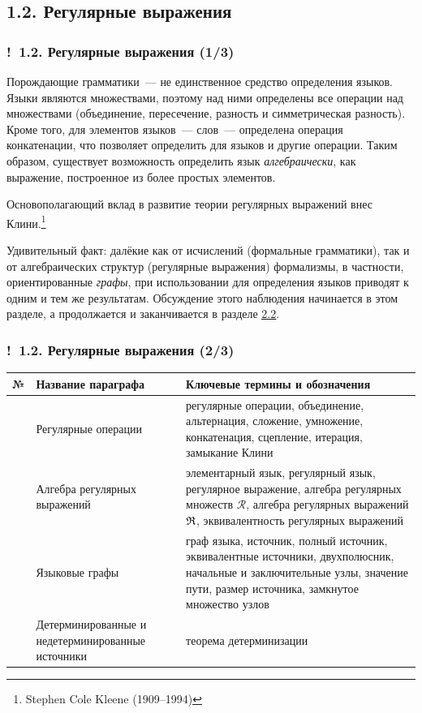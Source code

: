 \documentclass[mathserif,12pt,aspectratio=169]{beamer}
\def\emразделенной{\em разделенной}
\def\em#1{\it\color{blue}#1}
\let\cal\mathcal
\def\DMref#1#2{{\color{blue}\underline{\hyperlink{#2}{#1}}}}
\def\Ok{{\color{green}\textbf{!}\ }}
\begin{document}
\subsection{1.2. Регулярные выражения}
\begin{frame}
\frametitle{\Ok 1.2. Регулярные выражения (1/3)}

Порождающие грамматики~--- не единственное средство определения
языков. Языки являются множествами, поэтому над ними определены
все операции над множествами 
(объединение, пересечение, разность и 
симметрическая разность). Кроме того, для
элементов языков~--- слов~--- определена операция конкатенации,
что позволяет определить для языков и другие операции. 
Таким образом,
существует возможность определить язык
{\em алгебраически}, как выражение,
построенное из более простых элементов.

\medskip
Основополагающий вклад в развитие теории регулярных выражений 
внес Клини.\footnote{Stephen Cole Kleene (1909--1994)}

\medskip
Удивительный факт: далёкие как от исчислений (формальные грамматики),
так и от алгебраических структур (регулярные выражения) формализмы,
в частности, ориентированные {\em графы}, при использовании для определения 
языков приводят к одним и тем же результатам. Обсуждение этого наблюдения
начинается в этом разделе, а продолжается и заканчивается в разделе
\DMref{2.2}{2.2}.     

\end{frame}

\begin{frame}
\frametitle{\Ok 1.2. Регулярные выражения (2/3)}

\begin{tabular}[t]{p{10mm}|p{40mm}|p{95mm}}
  № & Название параграфа
  & Ключевые термины и обозначения \\
  \hline
\text{\DMref{1.2.1.}{1.2.1.}} &  Регулярные операции
  & { регулярные операции, 
  объединение, альтернация, сложение, умножение, конкатенация, сцепление,
  итерация, замыкание Клини}
   \\
\text{\DMref{1.2.2.}{1.2.2.}} & Алгебра регулярных выражений 
  & 
{ элементарный язык,
  регулярный язык, регулярное выражение, 
  алгебра регулярных множеств $\cal{R}$, алгебра регулярных выражений $\frak{R}$,
  эквивалентность регулярных выражений}
  \\
\text{\DMref{1.2.3.}{1.2.3.}}  & Языковые графы &
{граф языка, источник, полный источник, эквивалентные источники,
  двухполюсник, начальные и заключительные узлы, значение пути, размер источника,
  замкнутое множество узлов } 
  \\ 
\text{\DMref{1.2.4.}{1.2.4.}}  & Детерминированные и недетерминированные источники &
{ теорема детерминизации } 
\end{tabular}

\end{frame}
\end{document}
